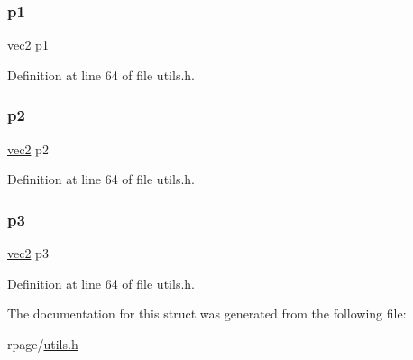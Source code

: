 \subsubsection{\texorpdfstring{p1}{p1}}
{\footnotesize\ttfamily \mbox{\hyperlink{structvec2}{vec2}} p1}



Definition at line 64 of file utils.\+h.

\mbox{\label{structpoly_a11216c2564b7f4dc65bd23c56a3799f3}} 
\subsubsection{\texorpdfstring{p2}{p2}}
{\footnotesize\ttfamily \mbox{\hyperlink{structvec2}{vec2}} p2}



Definition at line 64 of file utils.\+h.

\mbox{\label{structpoly_a47acacffb877abbd6df0ed40a9f1c3ad}} 
\subsubsection{\texorpdfstring{p3}{p3}}
{\footnotesize\ttfamily \mbox{\hyperlink{structvec2}{vec2}} p3}



Definition at line 64 of file utils.\+h.



The documentation for this struct was generated from the following file\+:\begin{DoxyCompactItemize}
\item 
rpage/\mbox{\hyperlink{utils_8h}{utils.\+h}}\end{DoxyCompactItemize}
